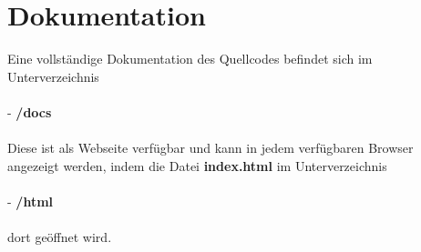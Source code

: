 \documentclass[
fontsize=10pt, 
listof = totoc,
parskip = half	
]{report}
\begin{document}
\section{Dokumentation}
Eine vollständige Dokumentation des Quellcodes befindet sich im Unterverzeichnis
\\\\ 
- \textbf{/docs}
\\\\
Diese ist als Webseite verfügbar und kann in jedem verfügbaren Browser angezeigt werden, indem die Datei \textbf{index.html} im Unterverzeichnis
\\\\
- \textbf{/html}
\\\\
dort geöffnet wird.




\end{document}
